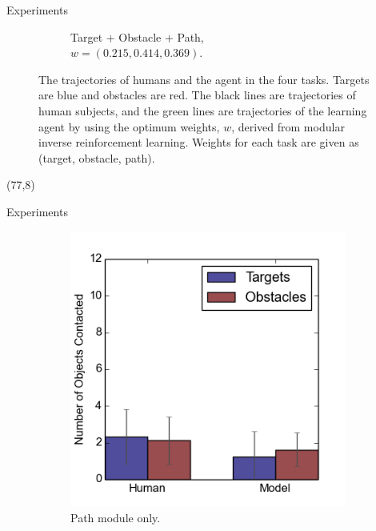 \documentclass[final]{beamer}
\begin{document}
\begin{frame}{}
\begin{textblock}{37}
\begin{block}{Experiments}
\begin{figure}[h]
\begin{subfigure}[b]{0.4\textwidth}
\caption{Target + Obstacle + Path, \\$w = (0.215, 0.414, 0.369)$. }
\end{subfigure}
\caption{The trajectories of humans and the agent in the four tasks. Targets are blue and obstacles are red. The
black lines are trajectories of human subjects, and the green lines are
trajectories of the learning agent by using the optimum weights, $w$, derived
from modular inverse reinforcement learning. Weights for each task are given as (target,
obstacle, path).}
\label{fig:exp}
\end{figure}

\end{block}
\end{textblock}

\begin{textblock}{39}(77,8)
\begin{block}{Experiments}
\begin{figure}[h]
\centering
\begin{subfigure}[b]{0.24\textwidth}
\includegraphics[width=\textwidth]{contact1.png}
\caption{Path module only.}
\end{subfigure}
\begin{subfigure}[b]{0.24\textwidth}

\end{subfigure}
\end{figure}
\end{block}
\end{textblock}
\end{frame}
\end{document}
